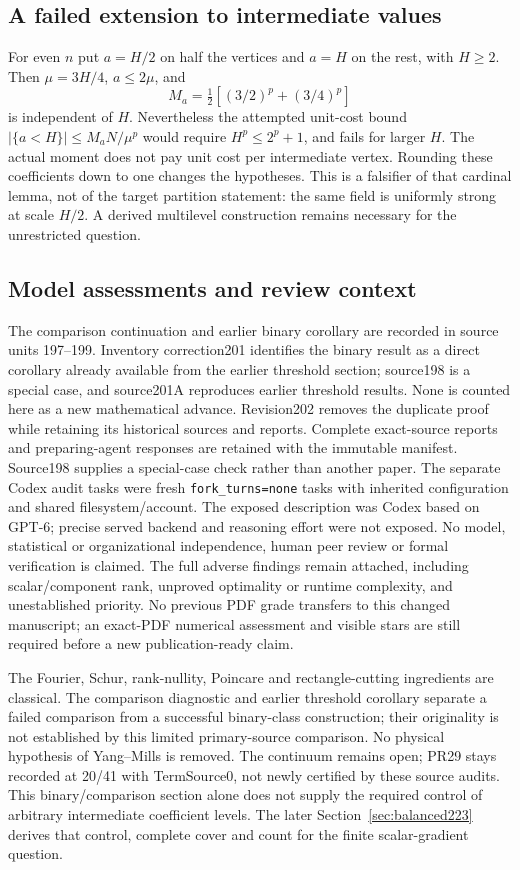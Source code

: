 \subsection{A failed extension to intermediate values}
For even $n$ put $a=H/2$ on half the vertices and $a=H$ on the rest, with
$H\ge2$. Then $\mu=3H/4$, $a\le2\mu$, and
\[
 M_a=\tfrac12[(3/2)^p+(3/4)^p]
\]
is independent of $H$. Nevertheless the attempted unit-cost bound
$|\{a<H\}|\le M_aN/\mu^p$ would require $H^p\le2^p+1$, and fails for
larger $H$. The actual moment does not pay unit cost per intermediate
vertex. Rounding these coefficients down to one changes the hypotheses.
This is a falsifier of that cardinal lemma, not of the target partition
statement: the same field is uniformly strong at scale $H/2$. A derived
multilevel construction remains necessary for the unrestricted question.

\subsection{Model assessments and review context}
The comparison continuation and earlier binary corollary are recorded in
source units 197--199. Inventory correction201 identifies the binary result
as a direct corollary already available from the earlier threshold section;
source198 is a special case, and source201A reproduces earlier threshold
results. None is counted here as a new mathematical advance. Revision202
removes the duplicate proof while retaining its historical sources and reports.
Complete exact-source reports and preparing-agent responses are retained
with the immutable manifest. Source198 supplies a special-case check rather
than another paper. The separate Codex audit tasks were fresh
\texttt{fork\_turns=none} tasks with inherited configuration and shared
filesystem/account. The exposed description was Codex based on GPT-6;
precise served backend and reasoning effort were not exposed. No model,
statistical or organizational independence, human peer review or formal
verification is claimed. The full adverse findings remain attached,
including scalar/component rank, unproved optimality or runtime complexity,
and unestablished priority. No previous PDF grade transfers to this changed
manuscript; an exact-PDF numerical assessment and visible stars are still
required before a new publication-ready claim.

The Fourier, Schur, rank-nullity, Poincare and rectangle-cutting ingredients
are classical. The comparison diagnostic and earlier threshold corollary separate a
failed comparison from a successful binary-class construction; their
originality is not established by this limited primary-source comparison.
No physical hypothesis of Yang--Mills is removed. The continuum remains
open; PR29 stays recorded at 20/41 with TermSource0, not newly certified by
these source audits. This binary/comparison section alone does not supply
the required control of arbitrary intermediate coefficient levels. The later
Section~\ref{sec:balanced223} derives that control, complete cover and
count for the finite scalar-gradient question.
